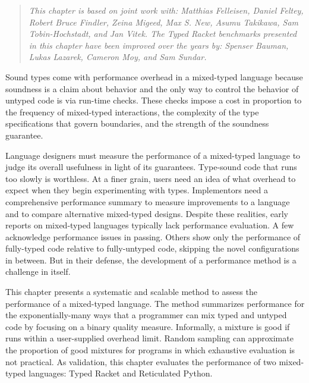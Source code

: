 \documentclass[ twoside,open=right,titlepage,numbers=noenddot,headinclude,%
                footinclude=true,cleardoublepage=empty,abstract=off,
                BCOR=5mm,paper=a4,fontsize=11pt,%
                ngerman,american,%
                parts,pdfspacing]{scrreprt}
\newenvironment{SInsetFlow}{\begin{quote}}{\end{quote}}
\begin{document}
\begin{SInsetFlow}\emph{This chapter is based on joint work with: Matthias Felleisen, Daniel Feltey, Robert Bruce Findler, Zeina Migeed, Max S. New, Asumu Takikawa, Sam Tobin{-}Hochstadt, and Jan Vitek. The Typed Racket benchmarks presented in this chapter
have been improved over the years by:
Spenser Bauman, Lukas Lazarek, Cameron Moy, and Sam Sundar.}\end{SInsetFlow}

\noindent{}Sound types come with performance overhead in a mixed{-}typed language
 because soundness is a claim about behavior and the only way to control
 the behavior of untyped code is via run{-}time checks.
These checks impose a cost in proportion to
 the frequency of mixed{-}typed interactions,
 the complexity of the type specifications that govern boundaries,
 and the strength of the soundness guarantee.

Language designers must measure the performance of a mixed{-}typed language
 to judge its overall usefulness in light of its guarantees.
Type{-}sound code that runs too slowly is worthless.
At a finer grain, users need an idea of what overhead to expect when they begin
 experimenting with types.
Implementors need a comprehensive performance summary to
 measure improvements to a language and to compare alternative mixed{-}typed
 designs.
Despite these realities, early reports on mixed{-}typed languages
 typically lack performance evaluation.
A few acknowledge performance issues in passing.
Others show only the performance of fully{-}typed code relative to fully{-}untyped
 code, skipping the novel configurations in between.
But in their defense, the development of a performance method is a challenge
 in itself.

This chapter presents a systematic and scalable method to assess the performance
 of a mixed{-}typed language.
The method summarizes performance for the exponentially{-}many ways that a programmer
 can mix typed and untyped code by focusing on a binary quality measure.
Informally, a mixture is good if runs within a user{-}supplied overhead limit.
Random sampling can approximate the proportion of good mixtures for programs
 in which exhaustive evaluation is not practical.
As validation, this chapter evaluates the performance of two
 mixed{-}typed languages: Typed Racket and Reticulated Python.
\end{document}
